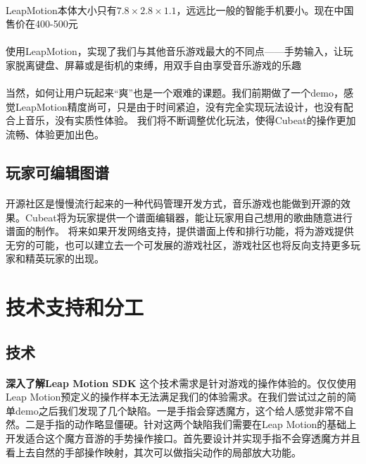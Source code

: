 \documentclass{article}
\begin{document}
\paragraph{}
LeapMotion本体大小只有$7.8\times2.8\times1.1$，远远比一般的智能手机要小。现在中国售价在400-500元
\paragraph{}
使用LeapMotion，实现了我们与其他音乐游戏最大的不同点——手势输入，让玩家脱离键盘、屏幕或是街机的束缚，用双手自由享受音乐游戏的乐趣
\paragraph{}
当然，如何让用户玩起来“爽”也是一个艰难的课题。我们前期做了一个demo，感觉LeapMotion精度尚可，只是由于时间紧迫，没有完全实现玩法设计，也没有配合上音乐，没有实质性体验。
我们将不断调整优化玩法，使得Cubeat的操作更加流畅、体验更加出色。
\subsection{玩家可编辑图谱}
\paragraph{}
开源社区是慢慢流行起来的一种代码管理开发方式，音乐游戏也能做到开源的效果。Cubeat将为玩家提供一个谱面编辑器，能让玩家用自己想用的歌曲随意进行谱面的制作。
将来如果开发网络支持，提供谱面上传和排行功能，将为游戏提供无穷的可能，也可以建立去一个可发展的游戏社区，游戏社区也将反向支持更多玩家和精英玩家的出现。
\newpage
\section{技术支持和分工}
\subsection{技术}
\paragraph{}
\textbf{深入了解Leap Motion SDK}
这个技术需求是针对游戏的操作体验的。仅仅使用Leap Motion预定义的操作样本无法满足我们的体验需求。在我们尝试过之前的简单demo之后我们发现了几个缺陷。一是手指会穿透魔方，这个给人感觉非常不自然。二是手指的动作略显僵硬。针对这两个缺陷我们需要在Leap Motion的基础上开发适合这个魔方音游的手势操作接口。首先要设计并实现手指不会穿透魔方并且看上去自然的手部操作映射，其次可以做指尖动作的局部放大功能。
\end{document}

